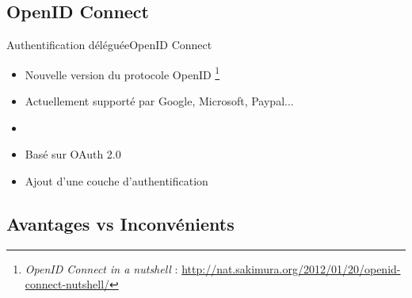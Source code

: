 \documentclass{beamer}
\begin{document}
\subsection{OpenID Connect}

\begin{frame}{Authentification déléguée}{OpenID Connect}
  \begin{center}
    \begin{itemize}
    \item {
      Nouvelle version du protocole OpenID
      \footnote[frame]{
        \emph{OpenID Connect in a nutshell} :
        \url{http://nat.sakimura.org/2012/01/20/openid-connect-nutshell/}
      }
    }
    \item Actuellement supporté par Google, Microsoft, Paypal...
    \item[~]
    \item Basé sur OAuth 2.0
    \item Ajout d'une couche d'authentification
    \end{itemize}
  \end{center}
\end{frame}

\subsection{Avantages vs Inconvénients}
\end{document}
